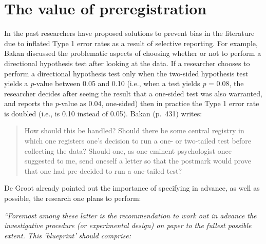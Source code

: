 \documentclass[
  oneside]{book}
\begin{document}
\hypertarget{the-value-of-preregistration}{%
\section{The value of preregistration}\label{the-value-of-preregistration}}

In the past researchers have proposed solutions to prevent bias in the literature due to inflated Type 1 error rates as a result of selective reporting. For example, Bakan \citeyearpar{bakan_test_1966} discussed the problematic aspects of choosing whether or not to perform a directional hypothesis test after looking at the data. If a researcher chooses to perform a directional hypothesis test only when the two-sided hypothesis test yields a \emph{p}-value between 0.05 and 0.10 (i.e., when a test yields \emph{p} = 0.08, the researcher decides after seeing the result that a one-sided test was also warranted, and reports the \emph{p}-value as 0.04, one-sided) then in practice the Type 1 error rate is doubled (i.e., is 0.10 instead of 0.05). Bakan (p.~431) writes:

\begin{quote}
How should this be handled? Should there be some central registry in which one registers one's decision to run a one- or two-tailed test before collecting the data? Should one, as one eminent psychologist once suggested to me, send oneself a letter so that the postmark would prove that one had pre-decided to run a one-tailed test?
\end{quote}

De Groot \citeyearpar{de_groot_methodology_1969} already pointed out the importance of specifying in advance, as well as possible, the research one plans to perform:

\emph{``Foremost among these latter is the recommendation to work out in advance the investigative procedure (or experimental design) on paper to the fullest possible extent. This `blueprint' should comprise:}
\end{document}
